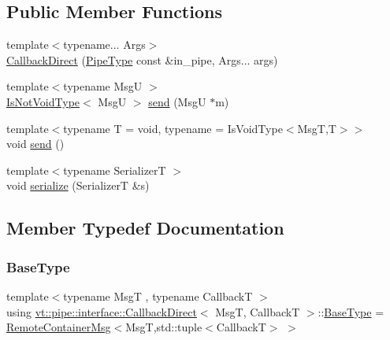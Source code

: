 \subsection*{Public Member Functions}
\begin{DoxyCompactItemize}
\item 
{\footnotesize template$<$typename... Args$>$ }\\\hyperlink{structvt_1_1pipe_1_1interface_1_1_callback_direct_acb59da0daedf51b2556d603b8910325e}{Callback\+Direct} (\hyperlink{namespacevt_ac9852acda74d1896f48f406cd72c7bd3}{Pipe\+Type} const \&in\+\_\+pipe, Args... args)
\item 
{\footnotesize template$<$typename MsgU $>$ }\\\hyperlink{structvt_1_1pipe_1_1interface_1_1_callback_direct_a619c2c4c96ec2573b87b992344c48826}{Is\+Not\+Void\+Type}$<$ MsgU $>$ \hyperlink{structvt_1_1pipe_1_1interface_1_1_callback_direct_a7379f2e63c757627089825c23e10475e}{send} (MsgU $\ast$m)
\item 
{\footnotesize template$<$typename T  = void, typename  = Is\+Void\+Type$<$\+Msg\+T,\+T$>$$>$ }\\void \hyperlink{structvt_1_1pipe_1_1interface_1_1_callback_direct_a2bda5c90901cc0acc3c406c968f9b43b}{send} ()
\item 
{\footnotesize template$<$typename SerializerT $>$ }\\void \hyperlink{structvt_1_1pipe_1_1interface_1_1_callback_direct_aeced2f2397fdb5bf3778f16036843eda}{serialize} (SerializerT \&s)
\end{DoxyCompactItemize}


\subsection{Member Typedef Documentation}
\mbox{\label{structvt_1_1pipe_1_1interface_1_1_callback_direct_ad166e55f0ac9ace4c87120e0acbeedb0}} 
\subsubsection{\texorpdfstring{Base\+Type}{BaseType}}
{\footnotesize\ttfamily template$<$typename MsgT , typename CallbackT $>$ \\
using \hyperlink{structvt_1_1pipe_1_1interface_1_1_callback_direct}{vt\+::pipe\+::interface\+::\+Callback\+Direct}$<$ MsgT, CallbackT $>$\+::\hyperlink{structvt_1_1pipe_1_1interface_1_1_callback_direct_ad166e55f0ac9ace4c87120e0acbeedb0}{Base\+Type} =  \hyperlink{structvt_1_1pipe_1_1interface_1_1_remote_container_msg}{Remote\+Container\+Msg}$<$MsgT,std\+::tuple$<$CallbackT$>$ $>$}

